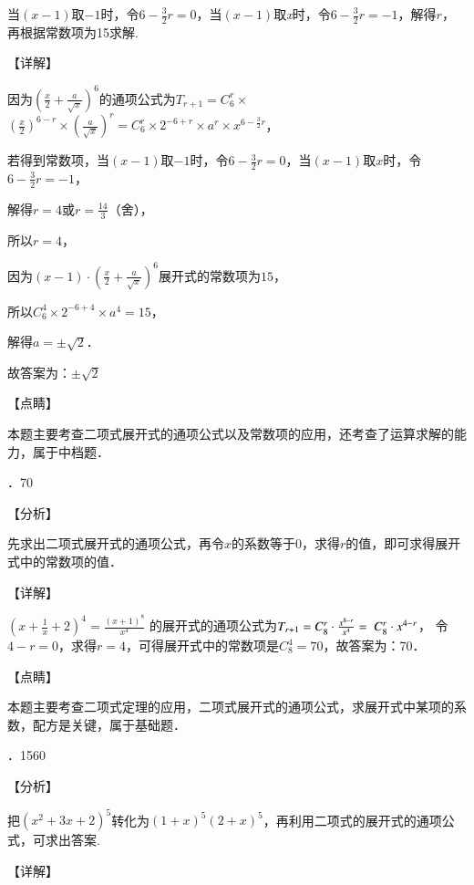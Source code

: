 \documentclass[a4paper,11pt,UTF8,twoside]{ctexart} %
\begin{document}
\noindent 当$(x-1)$取$-1$时，令$6-\frac{3}{2} r=0$，当$(x-1)$取\textit{x}时，令$6-\frac{3}{2} r=-1$，解得$r$，再根据常数项为15求解.

\noindent 【详解】

\noindent 因为$\left(\frac{x}{2} +\frac{a}{\sqrt{x} } \right)^{6} $的通项公式为$T_{r+1} =C_{6}^{r} \times $$\left(\frac{x}{2} \right)^{6-r} \times \left(\frac{a}{\sqrt{x} } \right)^{r} =C_{6}^{r} \times 2^{-6+r} \times a^{r} \times x^{6-\frac{3}{2} r} $，

\noindent 若得到常数项，当$(x-1)$取$-1$时，令$6-\frac{3}{2} r=0$，当$(x-1)$取$x$时，令$6-\frac{3}{2} r=-1$，

\noindent 解得$r=4$或$r=\frac{14}{3} $（舍），

\noindent 所以$r=4$，

\noindent 因为$(x-1)\cdot \left(\frac{x}{2} +\frac{a}{\sqrt{x} } \right)^{6} $展开式的常数项为$15$，

\noindent 所以$C_{6}^{4} \times 2^{-6+4} \times a^{4} =15$，

\noindent 解得$a=\pm \sqrt{2} $．

\noindent 故答案为：$\pm \sqrt{2} $

\noindent 【点睛】

\noindent 本题主要考查二项式展开式的通项公式以及常数项的应用，还考查了运算求解的能力，属于中档题．

．70

\noindent 【分析】

\noindent 先求出二项式展开式的通项公式，再令$x$的系数等于$0$，求得$r$的值，即可求得展开式中的常数项的值．

\noindent 【详解】

\noindent $\left(x+\frac{1}{x} +2\right)^{4} =\frac{\left(x+1\right)^{8} }{x^{4} } $ 的展开式的通项公式为$T_{r+1} =C_{8}^{r} \cdot \frac{x^{8-r} }{x^{4} } ={\rm \; }C_{8}^{r} \cdot x^{4-r} $， 令$4-r=0$，求得$r=4$，可得展开式中的常数项是$C_{8}^{4} =70$，故答案为：70．

\noindent 【点睛】

\noindent 本题主要考查二项式定理的应用，二项式展开式的通项公式，求展开式中某项的系数，配方是关键，属于基础题．

．1560

\noindent 【分析】

\noindent 把$(x^{2} +3x+2)^{5} $转化为$\left(1+x\right)^{5} \left(2+x\right)^{5} $，再利用二项式的展开式的通项公式，可求出答案.

\noindent 【详解】
\end{document}
